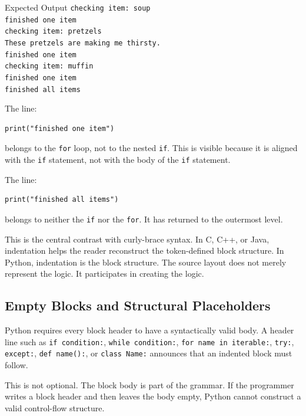 \documentclass[a4paper,twoside]{report}
\begin{document}
\begin{iobox}{Expected Output}
\texttt{checking item: soup} \\
\texttt{finished one item} \\
\texttt{checking item: pretzels} \\
\texttt{These pretzels are making me thirsty.} \\
\texttt{finished one item} \\
\texttt{checking item: muffin} \\
\texttt{finished one item} \\
\texttt{finished all items} \\
\end{iobox}


The line:

\begin{verbatim}
print("finished one item")
\end{verbatim}

belongs to the \texttt{for} loop, not to the nested \texttt{if}. This is visible because it is aligned with the \texttt{if} statement, not with the body of the \texttt{if} statement.

The line:

\begin{verbatim}
print("finished all items")
\end{verbatim}

belongs to neither the \texttt{if} nor the \texttt{for}. It has returned to the outermost level.

This is the central contrast with curly-brace syntax. In C, C++, or Java, indentation helps the reader reconstruct the token-defined block structure. In Python, indentation is the block structure. The source layout does not merely represent the logic. It participates in creating the logic.

\subsection{Empty Blocks and Structural Placeholders}

Python requires every block header to have a syntactically valid body. A header line such as \texttt{if condition:}, \texttt{while condition:}, \texttt{for name in iterable:}, \texttt{try:}, \texttt{except:}, \texttt{def name():}, or \texttt{class Name:} announces that an indented block must follow.

This is not optional. The block body is part of the grammar. If the programmer writes a block header and then leaves the body empty, Python cannot construct a valid control-flow structure.
\end{document}
